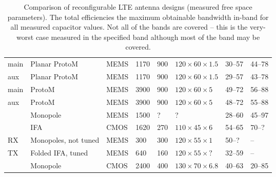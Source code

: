 \begin{table}[htbp]
\begin{tabularx}{\linewidth}{p{24mm}Xk{13mm}k{17mm}k{13mm}k{20mm}k{17mm}k{17mm}}
        \midrule
        \cite{ilvonen2014multiband} main     & Planar ProtoM               & MEMS     & 1170   & 900   & $120\times60\times1.5$   & 30--57 & 44–78         \\
        \cite{ilvonen2014multiband} aux      & Planar ProtoM               & MEMS     & 1170   & 900   & $120\times60\times1.5$   & 29--57 & 43--78        \\
        \cite{ilvonen2014multiband} main     & ProtoM                      & MEMS     & 3900   & 900   & $120\times60\times5$     & 49--72 & 56--88        \\
        \cite{ilvonen2014multiband} aux      & ProtoM                      & MEMS     & 3900   & 900   & $120\times60\times5$     & 48--72 & 55--88        \\
        \cite{morris2014tunable}             & Monopole                    & MEMS     & 1500   & ?     & ?                        & 28--60 & 45--97        \\
        \cite{xia2015compact}                & IFA                         & CMOS     & 1620   & 270   & $110\times45\times6$     & 54--65 & 70--?         \\
        \cite{tatomirescu2015alternative} RX & Monopoles, not tuned        & MEMS     & 300    & 300   & $120\times55\times1$     & 50--?  & --            \\
        \cite{tatomirescu2015alternative} TX & Folded IFA, tuned           & MEMS     & 640    & 160   & $120\times55\times?$     & 32--59 & --            \\
        \cite{trinh2016reconfigurable}       & Monopole                    & CMOS     & 2400   & 400   & $130\times70\times6.8$   & 40--63 & 20--85        \\
        \bottomrule
    \end{tabularx}
    \caption{Comparison of reconfigurable LTE antenna designs (measured free space parameters). The total efficiencies the maximum obtainable bandwidth in-band for all measured capacitor values. \MARK{}Not all of the bands are covered -- this is the very-worst case measured in the specified band although most of the band may be covered.}
    \label{tab:comparison_reconf_lte}
\end{table}

% 
% 
% 



